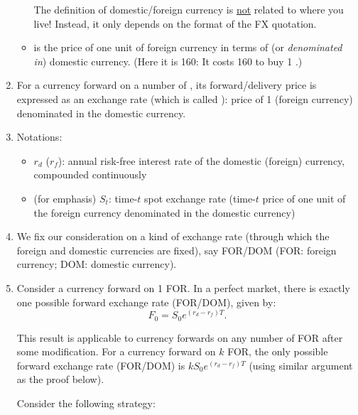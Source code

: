\begin{enumerate}
\begin{itemize}
\begin{warning}
The definition of domestic/foreign currency is \underline{not} related to where
you live! Instead, it only depends on the format of the FX quotation.
\end{warning}
\item {} is the price of one unit of foreign currency in
terms of (or \emph{denominated in}) domestic currency. (Here it is 160: It
costs 160 {\color{brown}} to buy 1
{\color{violet}}.)
\end{itemize}

\item For a currency forward on a number of , its
forward/delivery price is expressed as an exchange rate (which is called
): price of 1  (foreign currency)
denominated in the domestic currency.

\item Notations:
\begin{itemize}
\item \(r_d\) (\(r_f\)): annual risk-free interest rate of the domestic
(foreign) currency, compounded continuously
\item (for emphasis) \(S_t\): time-\(t\) spot exchange rate (time-\(t\) price of one unit of
the foreign currency denominated in the domestic currency)
\end{itemize}

\item We fix our consideration on a kind of exchange rate (through which the
foreign and domestic currencies are fixed), say FOR/DOM (FOR: foreign currency;
DOM: domestic currency).

\item \label{it:perfect-mkt-fwd-ex-rate}
Consider a currency forward on 1 FOR. In a perfect market, there is exactly one
possible forward exchange rate (FOR/DOM), given by:
\[
F_0=S_0e^{(r_d-r_f)T}.
\]
\begin{note}
This result is applicable to currency forwards on any number of FOR after some
modification. For a currency forward on \(k\) FOR, the only possible forward
exchange rate (FOR/DOM) is \(kS_0e^{(r_d-r_f)T}\) (using similar argument as
the proof below).
\end{note}

\begin{pf}
Consider the following strategy:


\end{pf}
\end{enumerate}
